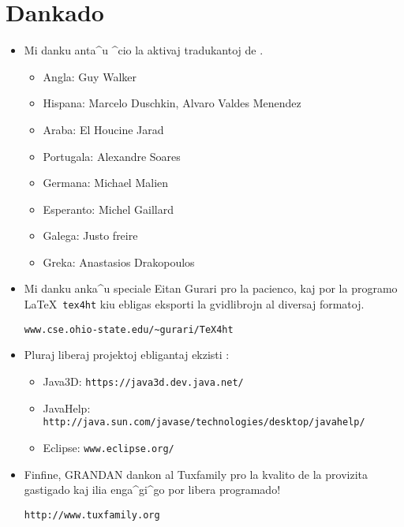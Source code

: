 \chapter*{Dankado}
\begin{itemize}
\item Mi danku anta^u ^cio la aktivaj tradukantoj de \xlogo{}.
  \begin{itemize}
  \item Angla: Guy Walker
  \item Hispana: Marcelo Duschkin, Alvaro Valdes Menendez
  \item Araba: El Houcine Jarad
  \item Portugala: Alexandre Soares
  \item Germana: Michael Malien
  \item Esperanto: Michel Gaillard
  \item Galega: Justo freire
  \item Greka: Anastasios Drakopoulos
  \end{itemize}
\item Mi danku anka^u speciale Eitan Gurari pro la pacienco, kaj por
  la programo \LaTeX\ \texttt{tex4ht} kiu ebligas eksporti la
  gvidlibrojn al diversaj formatoj.
  \begin{center}
    \texttt{www.cse.ohio-state.edu/\textasciitilde gurari/TeX4ht} 
  \end{center}
\item Pluraj liberaj projektoj ebligantaj ekzisti \xlogo{}:
  \begin{itemize}
  \item Java3D: \texttt{https://java3d.dev.java.net/} 
  \item JavaHelp: \texttt{http://java.sun.com/javase/technologies/desktop/javahelp/}
  \item Eclipse: \texttt{www.eclipse.org/}
  \end{itemize}
  \vspace{0.2cm}
\item Finfine, GRANDAN dankon al Tuxfamily pro la kvalito de la
  provizita gastigado kaj ilia enga^gi^go por libera programado!
  \begin{center}
    \texttt{http://www.tuxfamily.org}
  \end{center}
\end{itemize}
